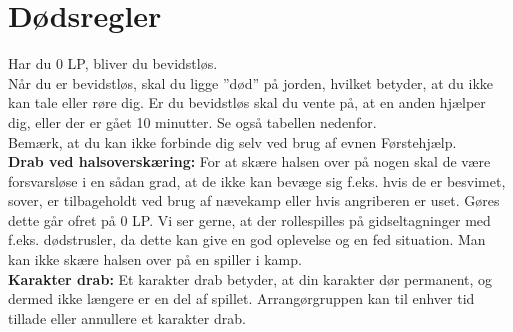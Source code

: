 \section{Dødsregler}
Har du 0 LP, bliver du bevidstløs.\\
Når du er bevidstløs, skal du ligge ”død” på jorden, hvilket betyder, at du ikke kan tale eller røre dig. Er du bevidstløs skal du vente på, at en anden hjælper dig, eller der er gået 10 minutter. Se også tabellen nedenfor.\\
Bemærk, at du kan ikke forbinde dig selv ved brug af evnen Førstehjælp.\\
\textbf{Drab ved halsoverskæring:} For at skære halsen over på nogen skal de være forsvarsløse i en sådan grad, at de ikke kan bevæge sig f.eks. hvis de er besvimet, sover, er tilbageholdt ved brug af nævekamp eller hvis angriberen er uset. Gøres dette går ofret på 0 LP.
Vi ser gerne, at der rollespilles på gidseltagninger med f.eks. dødstrusler, da dette kan give en god oplevelse og en fed situation.
Man kan ikke skære halsen over på en spiller i kamp.\\
\textbf{Karakter drab:} Et karakter drab betyder, at din karakter dør permanent, og dermed ikke længere er en del af spillet. Arrangørgruppen kan til enhver tid tillade eller annullere et karakter drab.
